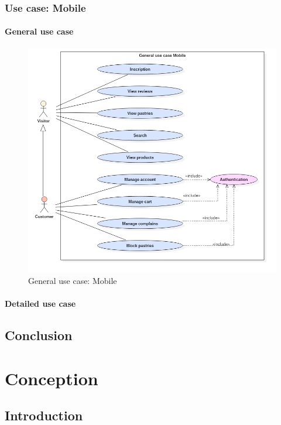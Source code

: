 \documentclass[12pt,a4paper]{report}
\begin{document}
	\subsection{Use case: Mobile}
		\subsubsection{General use case}
		\begin{figure}[H]
			\centering
			\includegraphics[width=7in,keepaspectratio]{UseCasemobile.png}
			\caption{General use case: Mobile}
			\label{user-case-mobile}
		\end{figure}
		\subsubsection{Detailed use case}
	
	\section*{Conclusion}
	
	
	
	\chapter{Conception}
	\section*{Introduction}
	
\end{document}

